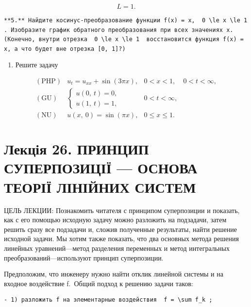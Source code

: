 \documentclass[
  ukrainian,
]{article}
\providecommand{\tightlist}{%
  \setlength{\itemsep}{0pt}\setlength{\parskip}{0pt}}
\begin{document}
\[
L=1.
\]

\begin{verbatim}
**5.** Найдите косинус-преобразование функции f(x) = x,  0 \le x \le 1 . Изобразите график обратного преобразования при всех значениях x. (Конечно, внутри отрезка  0 \le x \le 1  восстановится функция f(x) = x, а что будет вне отрезка [0, 1]?)
\end{verbatim}

\begin{enumerate}
\def\labelenumi{\arabic{enumi}.}
\setcounter{enumi}{5}
\tightlist
\item
  Решите задачу
\end{enumerate}

\[
\begin{array}{ll} (\text{PHP}) & u_t = u_{xx} + \sin{(3\pi x)}, & 0 < x < 1, & 0 < t < \infty, \\ (\text{GU}) & \begin{cases} u(0, \ t) = 0, \\ u(1, \ t) = 1, \end{cases} & 0 < t < \infty, \\ (\text{NU}) & u(x, \ 0) = \sin{(\pi x)}, & 0 \leqslant x \leqslant 1. \end{array}
\]

\section{Лекція 26. ПРИНЦИП СУПЕРПОЗИЦІЇ --- ОСНОВА ТЕОРІЇ ЛІНІЙНИХ
СИСТЕМ}\label{ux43bux435ux43aux446ux456ux44f-26.-ux43fux440ux438ux43dux446ux438ux43f-ux441ux443ux43fux435ux440ux43fux43eux437ux438ux446ux456ux457-ux43eux441ux43dux43eux432ux430-ux442ux435ux43eux440ux456ux457-ux43bux456ux43dux456ux439ux43dux438ux445-ux441ux438ux441ux442ux435ux43c}

ЦЕЛЬ ЛЕКЦИИ: Познакомить читателя с принципом суперпозиции и показать,
как с его помощью исходную задачу можно разложить на подзадачи, затем
решить сразу все подзадачи и, сложив полученные результаты, найти
решение исходной задачи. Мы хотим также показать, что два основных
метода решения линейных уравнений---метод разделения переменных и метод
интегральных преобразований---используют принцип суперпозиции.

Предположим, что инженеру нужно найти отклик линейной системы и на
входное воздействие f.~Общий подход к решению задачи таков:

\begin{verbatim}
- 1) разложить f на элементарные воздействия  f = \sum f_k ;
\end{verbatim}
\end{document}
